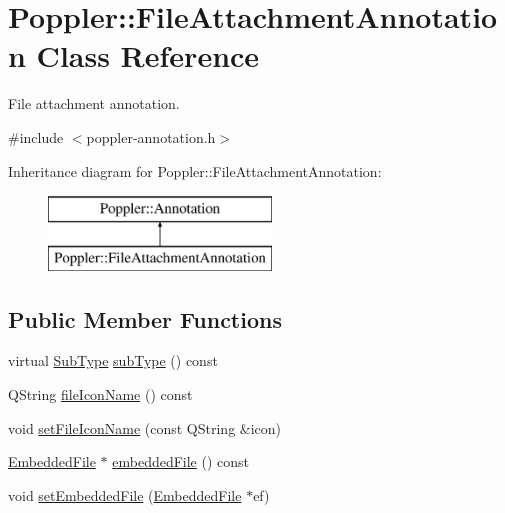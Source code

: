 \hypertarget{class_poppler_1_1_file_attachment_annotation}{}\section{Poppler\+:\+:File\+Attachment\+Annotation Class Reference}
\label{class_poppler_1_1_file_attachment_annotation}


File attachment annotation.  




{\ttfamily \#include $<$poppler-\/annotation.\+h$>$}

Inheritance diagram for Poppler\+:\+:File\+Attachment\+Annotation\+:\begin{figure}[H]
\begin{center}
\leavevmode
\includegraphics[height=2.000000cm]{class_poppler_1_1_file_attachment_annotation}
\end{center}
\end{figure}
\subsection*{Public Member Functions}
\begin{DoxyCompactItemize}
\item 
virtual \hyperlink{class_poppler_1_1_annotation_a2d592999c330949d64679cfa9e81113f}{Sub\+Type} \hyperlink{class_poppler_1_1_file_attachment_annotation_a7c3d7b8924142ece38d3909af0cf1425}{sub\+Type} () const
\item 
Q\+String \hyperlink{class_poppler_1_1_file_attachment_annotation_a312ae35369786841422fa8b2ff7c5fd2}{file\+Icon\+Name} () const
\item 
void \hyperlink{class_poppler_1_1_file_attachment_annotation_a09f0977d356503ab7e92bdf7fbf5d53e}{set\+File\+Icon\+Name} (const Q\+String \&icon)
\item 
\hyperlink{class_poppler_1_1_embedded_file}{Embedded\+File} $\ast$ \hyperlink{class_poppler_1_1_file_attachment_annotation_a619d16ea3943127df658ae9f7233e06f}{embedded\+File} () const
\item 
void \hyperlink{class_poppler_1_1_file_attachment_annotation_a324a0da1bfb565820f63276bf5b01f25}{set\+Embedded\+File} (\hyperlink{class_poppler_1_1_embedded_file}{Embedded\+File} $\ast$ef)
\end{DoxyCompactItemize}
